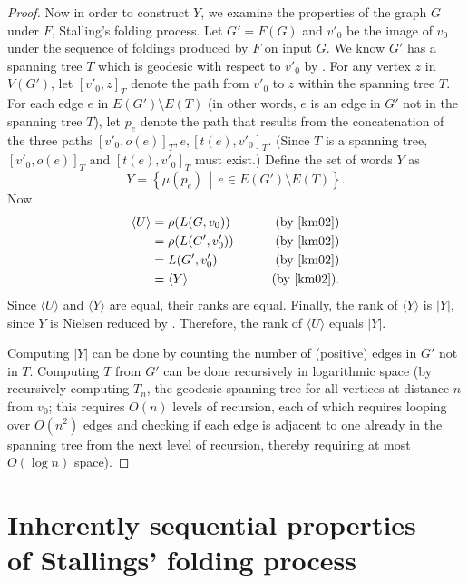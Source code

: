 \documentclass{article}
\newcommand{\gen}[1]{\langle #1 \rangle}
\begin{document}
\begin{proof}
  Now in order to construct $Y$, we examine the properties of the graph $G$ under $F$, Stalling's folding process.
  Let $G' = F(G)$ and $v'_0$ be the image of $v_0$ under the sequence of foldings produced by $F$ on input $G$.
  We know $G'$ has a spanning tree $T$ which is geodesic with respect to $v'_0$ by \cite[Lemma~6.6]{km02}.
  For any vertex $z$ in $V(G')$, let $[v'_0, z]_T$ denote the path from $v'_0$ to $z$ within the spanning tree $T$.
  For each edge $e$ in $E(G') \setminus E(T)$ (in other words, $e$ is an edge in $G'$ not in the spanning tree $T$), let $p_e$ denote the path that results from the concatenation of the three paths $[v'_0, o(e)]_T, e, [t(e), v'_0]_T$.
  (Since $T$ is a spanning tree, $[v'_0, o(e)]_T$ and $[t(e), v'_0]_T$ must exist.)
  Define the set of words $Y$ as
  \begin{equation*}
    Y = \left\{\mu(p_e) \, \middle| \, e \in E(G') \setminus E(T) \right\}.
  \end{equation*}
  Now
  \begin{align*}
    \gen{U} & = \rho(L(G, v_0)) & \qquad \text{(by \cite[Proposition~3.8]{km02})} \\
            & = \rho(L(G', v'_0)) & \qquad \text{(by \cite[Lemma~3.4]{km02})} \\
            & = L(G', v'_0) & \qquad \text{(by \cite[Lemma~2.9]{km02})} \\
            & = \gen{Y} & \qquad \text{(by \cite[Lemma~6.1]{km02})}.
  \end{align*}
  Since $\gen{U}$ and $\gen{Y}$ are equal, their ranks are equal.
  Finally, the rank of $\gen{Y}$ is $|Y|$, since $Y$ is Nielsen reduced by \cite[Proposition~6.7]{km02}.
  Therefore, the rank of $\gen{U}$ equals $|Y|$.

  Computing $|Y|$ can be done by counting the number of (positive) edges in $G'$ not in $T$.
  Computing $T$ from $G'$ can be done recursively in logarithmic space (by recursively computing $T_n$, the geodesic spanning tree for all vertices at distance $n$ from $v_0$; this requires $O(n)$ levels of recursion, each of which requires looping over $O(n^2)$ edges and checking if each edge is adjacent to one already in the spanning tree from the next level of recursion, thereby requiring at most $O(\log n)$ space).
\end{proof}




\section[Inherently sequential properties of Stallings' folding process]{Inherently sequential properties \\ of Stallings' folding process}
\end{document}
